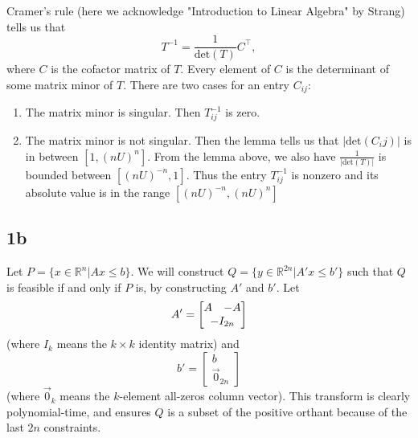 \documentclass{article}
\begin{document}
Cramer's rule (here we acknowledge "Introduction to Linear Algebra" by Strang) tells us that 
\[T^{-1} = \frac{1}{\text{det}(T)}C^{\intercal},\]
where $C$ is the cofactor matrix of $T$. Every element of $C$ is the
determinant of some matrix minor of $T$. There are two cases for an entry $C_{ij}$:

\begin{enumerate} 

\item The matrix minor is singular. Then $T^{-1}_{ij}$ is zero.
\item The matrix minor is not singular. Then the lemma tells us that $|\text{det}(C_ij)|$ is in
between $[1, (nU)^{n}]$. From the lemma above, we also have
$\frac{1}{|\text{det}(T)|}$ is bounded between $[(nU)^{-n},1]$. Thus the entry $T^{-1}_{ij}$ is nonzero and its absolute value is in the range
$[(nU)^{-n}, (nU)^{n}]$
\end{enumerate}
\subsection*{1b}
Let $P = \{x \in \mathbb{R}^n | Ax \leqslant b\}$. We will construct $Q = \{y \in \mathbb{R}^{2n} | A'x \leqslant b'\} $ such that $Q$ is feasible if and only if $P$ is, by constructing $A'$ and $b'$. Let
\[ A' = \begin{bmatrix} A & -A \\ \multicolumn{2}{c}{-I_{2n}} \end{bmatrix}\]
(where $I_k$ means the $k \times k$ identity matrix) and
\[ b' = \begin{bmatrix} b \\ \vec0_{2n} \end{bmatrix} \] 
(where $\vec 0_k$ means the $k$-element all-zeros column vector). This transform is clearly polynomial-time, and ensures $Q$ is a subset of the positive orthant because of the last $2n$ constraints.
\end{document}
